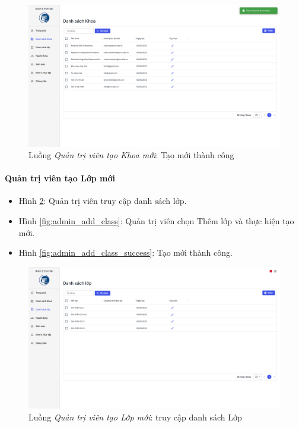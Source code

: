 \documentclass[./../main.tex]{subfiles}
\begin{document}
\begin{figure}[]
	\includegraphics[width=\linewidth]{./images/image58.png}
	\caption{Luồng \emph{Quản trị viên tạo Khoa mới}: Tạo mới thành công}
	\label{fig:admin_add_org_success}
\end{figure}

\paragraph*{Quản trị viên tạo Lớp mới}

\begin{itemize}
	\item Hình \ref{fig:admin_access_list_classes}: Quản trị viên truy cập danh sách lớp.
	\item Hình \ref{fig:admin_add_class}: Quản trị viên chọn Thêm lớp và thực hiện tạo mới.
	\item Hình \ref{fig:admin_add_class_success}: Tạo mới thành công.
\end{itemize}

\begin{figure}[]
	\includegraphics[width=\linewidth]{./images/image59.png}
	\caption{Luồng \emph{Quản trị viên tạo Lớp mới}: truy cập danh sách Lớp}
	\label{fig:admin_access_list_classes}
\end{figure}
\end{document}
